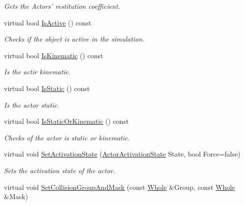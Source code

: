 \begin{DoxyCompactItemize}
\begin{DoxyCompactList}\small\item\em Gets the Actors' restitution coefficient. \item\end{DoxyCompactList}\item 
virtual bool \hyperlink{classphys_1_1ActorBasePhysicsSettings_aeb966cf55b9b626897731f42b5a2fc64}{IsActive} () const 
\begin{DoxyCompactList}\small\item\em Checks if the object is active in the simulation. \item\end{DoxyCompactList}\item 
virtual bool \hyperlink{classphys_1_1ActorBasePhysicsSettings_a8128bcfc407909a57026eb38812b1d1d}{IsKinematic} () const 
\begin{DoxyCompactList}\small\item\em Is the actir kinematic. \item\end{DoxyCompactList}\item 
virtual bool \hyperlink{classphys_1_1ActorBasePhysicsSettings_a68c32cbe7329e138c5ea11c5b098483f}{IsStatic} () const 
\begin{DoxyCompactList}\small\item\em Is the actor static. \item\end{DoxyCompactList}\item 
virtual bool \hyperlink{classphys_1_1ActorBasePhysicsSettings_a5fe007187584b836ada963f8a23eb377}{IsStaticOrKinematic} () const 
\begin{DoxyCompactList}\small\item\em Checks of the actor is static or kinematic. \item\end{DoxyCompactList}\item 
virtual void \hyperlink{classphys_1_1ActorBasePhysicsSettings_ab0b1760f3730e85470097d44985a5b56}{SetActivationState} (\hyperlink{namespacephys_a7d434b1a52cf5290a9ecc972b87a6a40}{ActorActivationState} State, bool Force=false)
\begin{DoxyCompactList}\small\item\em Sets the activation state of the actor. \item\end{DoxyCompactList}\item 
virtual void \hyperlink{classphys_1_1ActorBasePhysicsSettings_a992771e73cd1f98628618cf75938a5ef}{SetCollisionGroupAndMask} (const \hyperlink{namespacephys_a460f6bc24c8dd347b05e0366ae34f34a}{Whole} \&Group, const \hyperlink{namespacephys_a460f6bc24c8dd347b05e0366ae34f34a}{Whole} \&Mask)

\end{DoxyCompactItemize}
